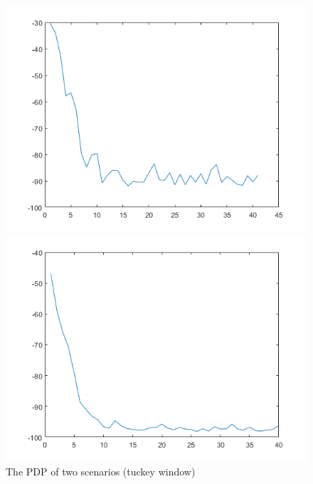 \documentclass[a4paper]{article}
\begin{document}
	\begin{figure}[hbtp]
		\begin{minipage}[t]{0.5\linewidth}
			\centering
			\includegraphics[scale=0.5]{lab1/PDP_LOS_tuck.png}
			\vspace{-0.5cm}
			\centering
		\end{minipage}
		\begin{minipage}[t]{0.5\linewidth}
			\centering
			\includegraphics[scale=0.5]{lab1/PDP_NLOS_tuck.png}
			\vspace{-0.5cm}
			\centering
		\end{minipage}
		\caption{The PDP of two scenarios (tuckey window)}
		\label{fig:tuckey_PDP}
	\end{figure}
	
\end{document}
